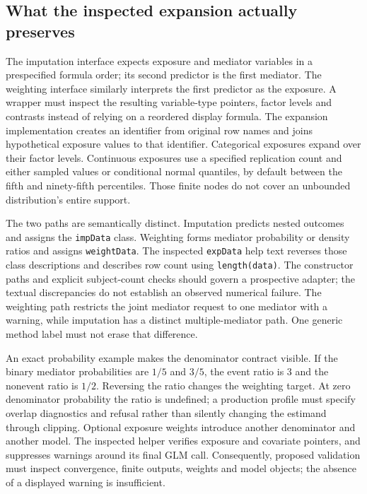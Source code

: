 \subsection{What the inspected expansion actually preserves}
\label{exec23:medflex-expansion}
The imputation interface expects exposure and mediator variables in a
prespecified formula order; its second predictor is the first mediator.
The weighting interface similarly interprets the first predictor as the
exposure. A wrapper must inspect the resulting variable-type pointers, factor
levels and contrasts instead of relying on a reordered display formula.
The expansion implementation creates an identifier from original row names
and joins hypothetical exposure values to that identifier. Categorical
exposures expand over their factor levels. Continuous exposures use a
specified replication count and either sampled values or conditional normal
quantiles, by default between the fifth and ninety-fifth percentiles. Those
finite nodes do not cover an unbounded distribution's entire support.
\citep{exec23_medflex_sources}

The two paths are semantically distinct. Imputation predicts nested outcomes
and assigns the \texttt{impData} class. Weighting forms mediator probability
or density ratios and assigns \texttt{weightData}. The inspected
\texttt{expData} help text reverses those class descriptions and describes
row count using \texttt{length(data)}. The constructor paths and explicit
subject-count checks should govern a prospective adapter; the textual
discrepancies do not establish an observed numerical failure. The weighting
path restricts the joint mediator request to one mediator with a warning,
while imputation has a distinct multiple-mediator path. One generic method
label must not erase that difference.
\citep{exec23_medflex_sources}

An exact probability example makes the denominator contract visible. If
the binary mediator probabilities are $1/5$ and $3/5$, the event ratio is
3 and the nonevent ratio is $1/2$. Reversing the ratio changes the weighting
target. At zero denominator probability the ratio is undefined; a production
profile must specify overlap diagnostics and refusal rather than silently
changing the estimand through clipping. Optional exposure weights introduce
another denominator and another model. The inspected helper verifies exposure
and covariate pointers, and suppresses warnings around its final GLM call.
Consequently, proposed validation must inspect convergence, finite outputs,
weights and model objects; the absence of a displayed warning is insufficient.
\citep{exec23_medflex_sources,exec23_medflex_reference}

